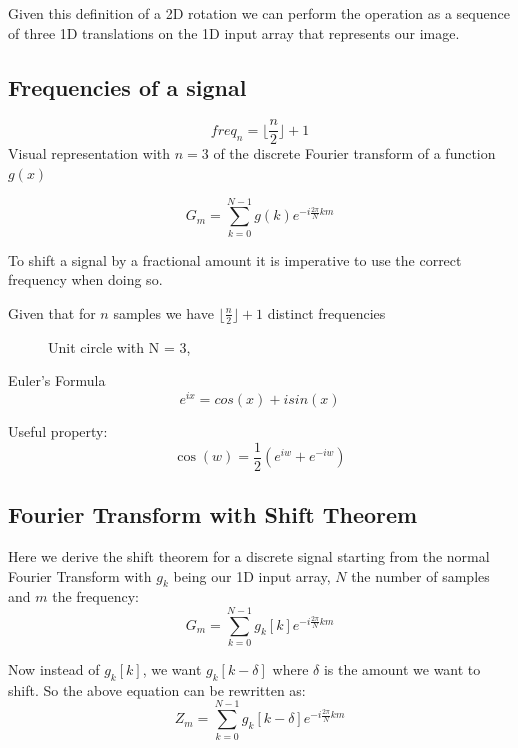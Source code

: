 \documentclass[]{usiinfbachelorproject}
\begin{document}
	Given this definition of a 2D rotation we can perform the operation as a sequence of three 1D translations on the 1D input array that represents our image.
	
	
	
	\subsection{Frequencies of a signal}
	\begin{equation}
		freq_{n} = \lfloor \frac{n}{2} \rfloor + 1 \label{freq_equation}
	\end{equation}
	Visual representation with $n=3$ of the discrete Fourier transform of a function $g(x)$
	
	\begin{equation*}
		G_m = \displaystyle\sum_{k=0}^{N-1}g(k)e^{-i \frac{2\pi}{N}km}
	\end{equation*}
	
	To shift a signal by a fractional amount it is imperative to use the correct frequency when doing so.
	
	Given that for $n$ samples we have $\lfloor \frac{n}{2} \rfloor + 1$ distinct frequencies
	
	
	\begin{figure}
		\centering
		
		\caption{Unit circle with N = 3, }
	\end{figure}
	
	Euler's Formula
	\begin{equation}
		e^{ix} = cos(x)  + i sin(x)
	\end{equation}
	
	Useful property:
	\begin{equation}
		\cos(w)= \frac{1}{2}(e^{iw}+ e^{-iw})
	\end{equation}
	
	
	\subsection{Fourier Transform with Shift Theorem}
	Here we derive the shift theorem for a discrete signal starting from the normal Fourier Transform with $g_k$ being our 1D input array, $N$ the number of samples and $m$ the frequency:
	\begin{equation*}
		G_m = \displaystyle\sum_{k=0}^{N-1}g_k[k]e^{-i \frac{2\pi}{N} km}
	\end{equation*}
	
	Now instead of $g_k[k]$, we want $g_k[k - \delta]$ where $\delta$ is the amount we want to shift.
	So the above equation can be rewritten as:
	\begin{equation*}
		Z_m = \displaystyle\sum_{k=0}^{N-1}g_k[k - \delta]e^{-i \frac{2\pi}{N} km}
	\end{equation*}
	
\end{document}
